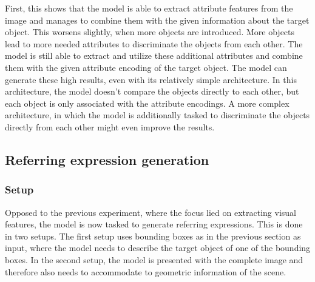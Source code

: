 First, this shows that the model is able to extract attribute features from the image and manages to combine them with the given information about the target object.
This worsens slightly, when more objects are introduced.
More objects lead to more needed attributes to discriminate the objects from each other.
The model is still able to extract and utilize these additional attributes and combine them with the given attribute encoding of the target object.
The model can generate these high results, even with its relatively simple architecture.
In this architecture, the model doesn't compare the objects directly to each other, but each object is only associated with the attribute encodings.
A more complex architecture, in which the model is additionally tasked to discriminate the objects directly from each other might even improve the results.

\subsection{Referring expression generation}
\label{sec:referring_expression_generation}
\subsubsection*{Setup}

Opposed to the previous experiment, where the focus lied on extracting visual features, the model is now tasked to generate referring expressions.
This is done in two setups.
The first setup uses bounding boxes as in the previous section as input, where the model needs to describe the target object of one of the bounding boxes.
In the second setup, the model is presented with the complete image and therefore also needs to accommodate to geometric information of the scene.

